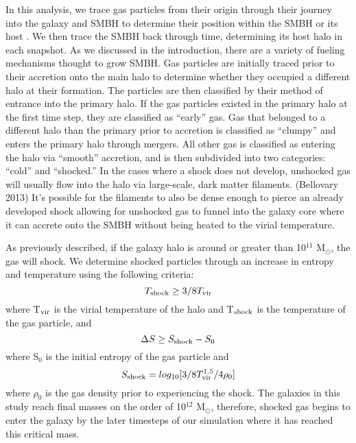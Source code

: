 \documentclass[12pt,headA,chapB]{fiskthesis}
\begin{document}

In this analysis, we trace gas particles from their origin through their journey into the galaxy and SMBH to determine their position within the SMBH or its host \citep{Brooks2009} . We then trace the SMBH back through time, determining its host halo in each snapshot. As we discussed in the introduction, there are a variety of fueling mechanisms thought to grow SMBH. Gas particles are initially traced prior to their accretion onto the main halo to determine whether they occupied a different halo at their formation. The particles are then classified by their method of entrance into the primary halo. If the gas particles existed in the primary halo at the first time step, they are classified as ``early'' gas. Gas that belonged to a different halo than the primary prior to accretion is classified as ``clumpy'' and enters the primary halo through mergers. All other gas is classified as entering the halo via ``smooth'' accretion, and is then subdivided into two categories: ``cold'' and ``shocked.'' In the cases where a shock does not develop, unshocked gas will usually flow into the halo via large-scale, dark matter filaments. (Bellovary 2013) It's possible for the filaments to also be dense enough to pierce an already developed shock allowing for unshocked gas to funnel into the galaxy core where it can accrete onto the SMBH without being heated to the virial temperature.

As previously described, if the galaxy halo is around or greater than 10$^{11}$ M$_{\odot} $, the gas will shock. We determine shocked particles through an increase in entropy and temperature using the following criteria:
\begin{equation}
T_{\rm shock} \geq 3/8 T_{\rm vir}
\end{equation}
where T$_{\rm vir}$ is the virial temperature of the halo and T$_{\rm shock}$ is the temperature of the gas particle, and 
\begin{equation}
\Delta S \geq S_{\rm shock} - S_0
\end{equation}
where S$_0$ is the initial entropy of the gas particle and 
\begin{equation}
S_{\rm shock} = log_{10}[3/8 T_{\rm vir}^{1.5}/4 \rho_0]
\end{equation}
where $\rho_0$ is the gas density prior to experiencing the shock. The galaxies in this study reach final masses on the order of 10$^{12}$ M$_{\odot} $, therefore, shocked gas begins to enter the galaxy by the later timesteps of our simulation where it has reached this critical mass. 
\end{document}
